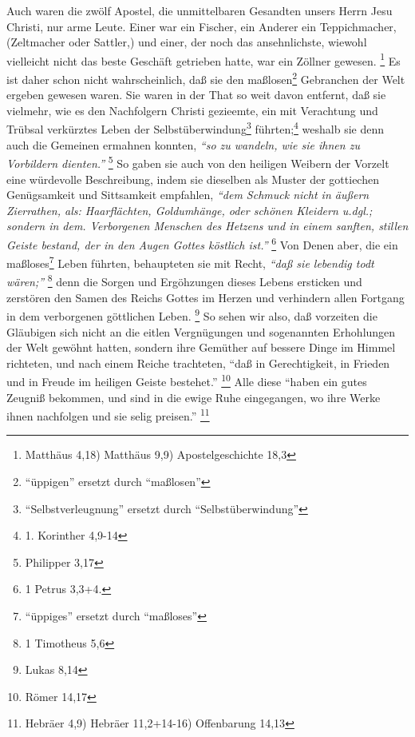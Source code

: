 Auch waren die zwölf Apostel, die unmittelbaren Gesandten unsers Herrn Jesu
Christi, nur arme Leute. Einer war ein Fischer, ein Anderer ein Teppichmacher,
(Zeltmacher oder Sattler,) und einer, der noch das ansehnlichste, wiewohl
vielleicht nicht das beste Geschäft getrieben hatte, war ein Zöllner
gewesen.
\footnote{Matthäus 4,18) Matthäus 9,9) Apostelgeschichte 18,3} 
Es ist daher
schon nicht wahrscheinlich, daß sie den maßlosen\footnote{"`üppigen"' ersetzt durch "`maßlosen"'} Gebranchen der Welt ergeben
gewesen waren. Sie waren in der That so weit davon entfernt, daß sie vielmehr,
wie es den Nachfolgern Christi gezieemte, ein mit Verachtung und Trübsal
verkürztes Leben der Selbstüberwindung\footnote{"`Selbstverleugnung"' ersetzt durch "`Selbstüberwindung"'} führten;\footnote{1. Korinther 4,9-14} 
weshalb
sie denn auch die Gemeinen ermahnen konnten, 
\textit{"`so zu wandeln, wie sie ihnen zu
Vorbildern dienten."'}
\footnote{Philipper 3,17} 
So gaben sie auch von den heiligen
Weibern der Vorzelt eine würdevolle Beschreibung, indem sie dieselben als Muster
der gottiechen Genügsamkeit und Sittsamkeit empfahlen, 
\textit{"`dem Schmuck nicht in
äußern Zierrathen, als: Haarflächten, Goldumhänge, oder schönen Kleidern u.dgl.;
sondern in dem. Verborgenen Menschen des Hetzens und in einem sanften, stillen
Geiste bestand, der in den Augen Gottes köstlich ist."'}
\footnote{1 Petrus 3,3+4.} 
Von Denen aber, die ein maßloses\footnote{"`üppiges"' ersetzt durch "`maßloses"'} Leben führten, behaupteten sie mit Recht,
\textit{"`daß sie lebendig todt wären;"'}
\footnote{1 Timotheus 5,6} 
denn die Sorgen und
Ergöhzungen dieses Lebens ersticken und zerstören den Samen des Reichs Gottes im
Herzen und verhindern allen Fortgang in dem verborgenen göttlichen
Leben.
\footnote{Lukas 8,14} 
So sehen wir also, daß vorzeiten die Gläubigen sich
nicht an die eitlen Vergnügungen und sogenannten Erhohlungen der Welt gewöhnt
hatten, sondern ihre Gemüther auf bessere Dinge im Himmel richteten, und nach
einem Reiche trachteten, 
"`daß in Gerechtigkeit, in Frieden und in Freude im
heiligen Geiste bestehet."'
\footnote{Römer 14,17} 
Alle diese 
"`haben ein gutes
Zeugniß bekommen, und sind in die ewige Ruhe eingegangen, wo ihre Werke ihnen
nachfolgen und sie selig preisen."'
\footnote{Hebräer 4,9) Hebräer 11,2+14-16)
Offenbarung 14,13}

